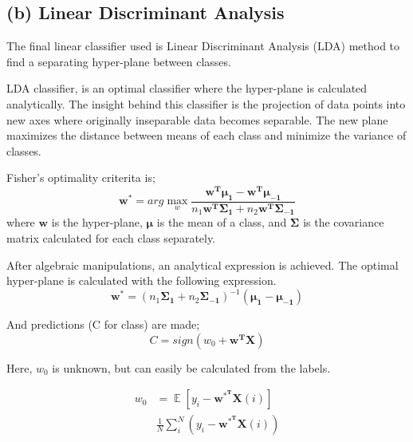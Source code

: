 \documentclass[11pt]{article}
\DeclareMathOperator*{\E}{\mathbb{E}}
\begin{document}
\subsection{(b) Linear Discriminant Analysis}
The final linear classifier used is Linear Discriminant Analysis (LDA) method to find a separating hyper-plane between classes. \medskip

LDA classifier, is an optimal classifier where the hyper-plane is calculated analytically. The insight behind this classifier is the projection of data points into new axes where originally inseparable data becomes separable. The new plane maximizes the distance between means of each class and minimize the variance of classes. \medskip

Fisher's optimality criterita is;
\begin{equation*}
    \bm{w^*}= arg\max_{w} \frac{\bm{w^T\mu_1-w^T\mu_{-1}}}{n_1\bm{w^T\Sigma_1}+n_2\bm{w^T\Sigma_{-1}}}
\end{equation*}
where $\bm{w}$ is the hyper-plane, $\bm{\mu}$ is the mean of a class, and $\bm{\Sigma}$ is the covariance matrix calculated for each class separately. \medskip

After algebraic manipulations, an analytical expression is achieved. The optimal hyper-plane is calculated with the following expression.
\begin{equation*}
    \bm{w^*} = (n_1\bm{\Sigma_1}+n_2\bm{\Sigma_{-1}})^{-1}(\bm{\mu_1}-\bm{\mu_{-1}})
\end{equation*}

And predictions (C for class) are made;
\begin{equation*}
    C=sign(w_0+\bm{w^TX})
\end{equation*}

Here, $w_0$ is unknown, but can easily be calculated from the labels.

\begin{align*}
    w_0 &= \E[y_i - \bm{w^{*^T}X}(i)]  \\
        &\frac{1}{N}\sum_i^N (y_i - \bm{w^{*^T}X}(i))
\end{align*}
\end{document}
